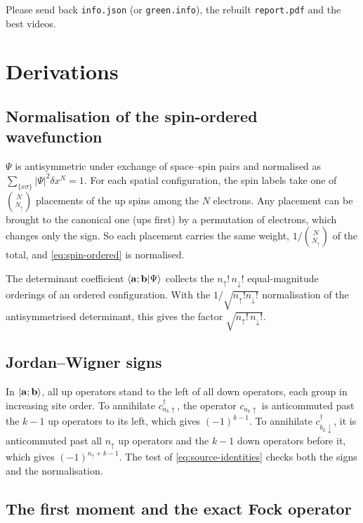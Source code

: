 \documentclass[11pt,a4paper]{article}
\newcommand{\code}[1]{\texttt{#1}}
\newcommand{\dx}{\delta x}
\newcommand{\up}{{\uparrow}}
\newcommand{\dn}{{\downarrow}}
\begin{document}
Please send back \code{info.json} (or \code{green.info}), the rebuilt \code{report.pdf} and the best videos.

\section{Derivations}
\label{app:derivations}

\subsection{Normalisation of the spin-ordered wavefunction}
\label{app:spin-ordered}

$\Psi$ is antisymmetric under exchange of space--spin pairs and normalised as $\sum_{\{x\sigma\}}|\Psi|^2\dx^N = 1$. For each spatial configuration, the spin labels take one of $\binom{N}{N_\up}$ placements of the up spins among the $N$ electrons. Any placement can be brought to the canonical one (ups first) by a permutation of electrons, which changes only the sign. So each placement carries the same weight, $1/\binom{N}{N_\up}$ of the total, and \cref{eq:spin-ordered} is normalised.

The determinant coefficient $\braket{\mathbf a;\mathbf b|\Psi}$ collects the $n_\up!\,n_\dn!$ equal-magnitude orderings of an ordered configuration. With the $1/\sqrt{n_\up!n_\dn!}$ normalisation of the antisymmetrised determinant, this gives the factor $\sqrt{n_\up!\,n_\dn!}$.

\subsection{Jordan--Wigner signs}

In $\ket{\mathbf a;\mathbf b}$, all up operators stand to the left of all down operators, each group in increasing site order. To annihilate $c^\dagger_{a_k\up}$, the operator $c_{a_k\up}$ is anticommuted past the $k-1$ up operators to its left, which gives $(-1)^{k-1}$. To annihilate $c^\dagger_{b_k\dn}$, it is anticommuted past all $n_\up$ up operators and the $k-1$ down operators before it, which gives $(-1)^{n_\up+k-1}$. The test of \cref{eq:source-identities} checks both the signs and the normalisation.

\subsection{The first moment and the exact Fock operator}
\label{app:first-moment}
\end{document}
